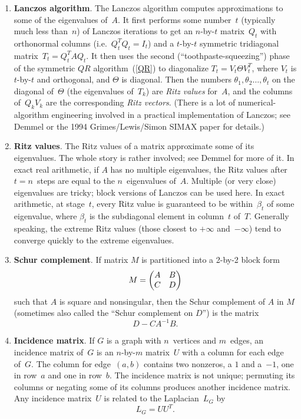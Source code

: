 \documentclass[11pt]{article}
\begin{document}
\begin{enumerate}
\item{\bf Lanczos algorithm}.
The Lanczos algorithm computes approximations
to some of the eigenvalues of~$A$. 
It first performs some number~$t$ (typically much less than~$n$)
of Lanczos iterations to get an $n$-by-$t$ matrix~$Q_t$ 
with orthonormal columns (i.e.\ $Q_t^TQ_t = I_t$) and a 
$t$-by-$t$ symmetric tridiagonal matrix~$T_t = Q_t^TAQ_t$.
It then uses the second (``toothpaste-squeezing'') phase of
the symmetric $QR$ algorithm~(\ref{QR}) to diagonalize
$T_t=V_t\Theta V_t^T$, where $V_t$ is $t$-by-$t$ and orthogonal,
and $\Theta$ is diagonal.
Then the numbers $\theta_1,\theta_2\ldots,\theta_t$ on the diagonal
of~$\Theta$ (the eigenvalues of~$T_k$) are {\em Ritz values} for~$A$,
and the columns of~$Q_kV_k$ are the corresponding {\em Ritz vectors}.
(There is a lot of numerical-algorithm engineering involved in a
practical implementation of Lanczos; 
see Demmel or the 1994 Grimes/Lewis/Simon SIMAX paper for details.)

\item{\bf Ritz values}.
The Ritz values of a matrix approximate some of its eigenvalues.
The whole story is rather involved; see Demmel for more of it.
In exact real arithmetic, if $A$ has no multiple eigenvalues, 
the Ritz values after $t=n$~steps are equal to the $n$~eigenvalues 
of~$A$. 
Multiple (or very close) eigenvalues are tricky; 
block versions of Lanczos can be used here.
In exact arithmetic, at stage~$t$, every Ritz value
is guaranteed to be within~$\beta_t$ of some eigenvalue,
where $\beta_t$ is the subdiagonal element in column~$t$ of~$T$.
Generally speaking, the extreme Ritz values 
(those closest to $+\infty$ and~$-\infty$)
tend to converge quickly to the extreme eigenvalues.

\item\label{schur}{\bf Schur complement}.
If matrix $M$ is partitioned into a 2-by-2 block form
$$ M =
\begin{pmatrix}
A & B \cr
C & D \cr
\end{pmatrix}
$$
such that $A$ is square and nonsingular, 
then the Schur complement of $A$ in $M$
(sometimes also called the ``Schur complement on $D$'')
is the matrix 
$$D - CA^{-1}B.$$

\item\label{inc}{\bf Incidence matrix}.
If $G$ is a graph with $n$~vertices and $m$~edges,
an incidence matrix of~$G$ is an $n$-by-$m$ matrix~$U$
with a column for each edge of~$G$.  
The column for edge~$(a,b)$ contains two nonzeros,
a $1$ and a~$-1$, one in row~$a$ and one in row~$b$.
The incidence matrix is not unique; permuting its columns
or negating some of its columns produces another incidence matrix.
Any incidence matrix~$U$ is related to the Laplacian~$L_G$ by
$$L_G = UU^T.$$


\end{enumerate}
\end{document}
